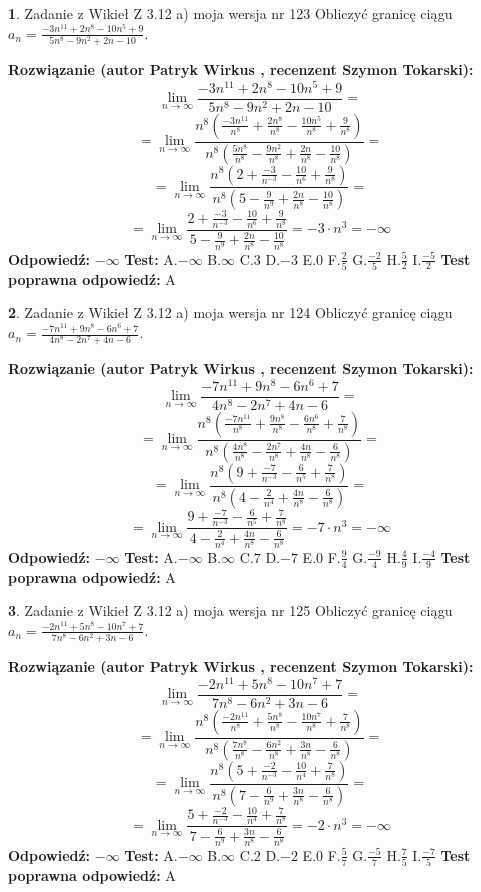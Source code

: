 \documentclass[12pt, a4paper]{article}
\theoremstyle{definition} %
\newtheorem{zad}{}
\newcommand{\zadStart}[1]{\begin{zad}#1\newline}
\newcommand{\zadStop}{\end{zad}}
\newcommand{\rozwStart}[2]{\noindent \textbf{Rozwiązanie (autor #1 , recenzent #2): }\newline}
\newcommand{\rozwStop}{\newline}
\newcommand{\odpStart}{\noindent \textbf{Odpowiedź:}\newline}
\newcommand{\odpStop}{\newline}
\newcommand{\testStart}{\noindent \textbf{Test:}\newline}
\newcommand{\testStop}{\newline}
\newcommand{\kluczStart}{\noindent \textbf{Test poprawna odpowiedź:}\newline}
\newcommand{\kluczStop}{\newline}
\begin{document}
\zadStart{Zadanie z Wikieł Z 3.12 a) moja wersja nr 123}
Obliczyć granicę ciągu $a_{n}=\frac{-3n^{11}+2n^{8}-10n^{5}+9}{5n^{8}-9n^{2}+2n-10}$.
\zadStop
\rozwStart{Patryk Wirkus}{Szymon Tokarski}
$$\lim\limits_{n\to\infty}\frac{-3n^{11}+2n^{8}-10n^{5}+9}{5n^{8}-9n^{2}+2n-10}=$$
$$=\lim\limits_{n\to\infty}\frac{n^{8}\left(\frac{-3n^{11}}{n^{8}}+\frac{2n^{8}}{n^{8}}-\frac{10n^{5}}{n^{8}}+\frac{9}{n^{8}}\right)}{n^{8}\left(\frac{5n^{8}}{n^{8}}-\frac{9n^{2}}{n^{8}}+\frac{2n}{n^{8}}-\frac{10}{n^{8}}\right)}=$$
$$=\lim\limits_{n\to\infty}\frac{n^{8}\left(2+\frac{-3}{n^{-3}}-\frac{10}{n^{6}}+\frac{9}{n^{8}}\right)}
{n^{8}\left(5-\frac{9}{n^{9}}+\frac{2n}{n^{8}}-\frac{10}{n^{8}}\right)}=$$
$$=\lim\limits_{n\to\infty}\frac{2+\frac{-3}{n^{-3}}-\frac{10}{n^{6}}+\frac{9}{n^{8}}}{5-\frac{9}{n^{9}}+\frac{2n}{n^{8}}-\frac{10}{n^{8}}}=-3\cdot n^{3} = -\infty$$
\rozwStop
\odpStart
$-\infty$
\odpStop
\testStart
A.$-\infty$
B.$\infty$
C.$3$
D.$-3$
E.$0$
F.$\frac{2}{5}$
G.$\frac{-2}{5}$
H.$\frac{5}{2}$
I.$\frac{-5}{2}$
\testStop
\kluczStart
A
\kluczStop



\zadStart{Zadanie z Wikieł Z 3.12 a) moja wersja nr 124}
Obliczyć granicę ciągu $a_{n}=\frac{-7n^{11}+9n^{8}-6n^{6}+7}{4n^{8}-2n^{7}+4n-6}$.
\zadStop
\rozwStart{Patryk Wirkus}{Szymon Tokarski}
$$\lim\limits_{n\to\infty}\frac{-7n^{11}+9n^{8}-6n^{6}+7}{4n^{8}-2n^{7}+4n-6}=$$
$$=\lim\limits_{n\to\infty}\frac{n^{8}\left(\frac{-7n^{11}}{n^{8}}+\frac{9n^{8}}{n^{8}}-\frac{6n^{6}}{n^{8}}+\frac{7}{n^{8}}\right)}{n^{8}\left(\frac{4n^{8}}{n^{8}}-\frac{2n^{7}}{n^{8}}+\frac{4n}{n^{8}}-\frac{6}{n^{8}}\right)}=$$
$$=\lim\limits_{n\to\infty}\frac{n^{8}\left(9+\frac{-7}{n^{-3}}-\frac{6}{n^{5}}+\frac{7}{n^{8}}\right)}
{n^{8}\left(4-\frac{2}{n^{4}}+\frac{4n}{n^{8}}-\frac{6}{n^{8}}\right)}=$$
$$=\lim\limits_{n\to\infty}\frac{9+\frac{-7}{n^{-3}}-\frac{6}{n^{5}}+\frac{7}{n^{8}}}{4-\frac{2}{n^{4}}+\frac{4n}{n^{8}}-\frac{6}{n^{8}}}=-7\cdot n^{3} = -\infty$$
\rozwStop
\odpStart
$-\infty$
\odpStop
\testStart
A.$-\infty$
B.$\infty$
C.$7$
D.$-7$
E.$0$
F.$\frac{9}{4}$
G.$\frac{-9}{4}$
H.$\frac{4}{9}$
I.$\frac{-4}{9}$
\testStop
\kluczStart
A
\kluczStop



\zadStart{Zadanie z Wikieł Z 3.12 a) moja wersja nr 125}
Obliczyć granicę ciągu $a_{n}=\frac{-2n^{11}+5n^{8}-10n^{7}+7}{7n^{8}-6n^{2}+3n-6}$.
\zadStop
\rozwStart{Patryk Wirkus}{Szymon Tokarski}
$$\lim\limits_{n\to\infty}\frac{-2n^{11}+5n^{8}-10n^{7}+7}{7n^{8}-6n^{2}+3n-6}=$$
$$=\lim\limits_{n\to\infty}\frac{n^{8}\left(\frac{-2n^{11}}{n^{8}}+\frac{5n^{8}}{n^{8}}-\frac{10n^{7}}{n^{8}}+\frac{7}{n^{8}}\right)}{n^{8}\left(\frac{7n^{8}}{n^{8}}-\frac{6n^{2}}{n^{8}}+\frac{3n}{n^{8}}-\frac{6}{n^{8}}\right)}=$$
$$=\lim\limits_{n\to\infty}\frac{n^{8}\left(5+\frac{-2}{n^{-3}}-\frac{10}{n^{4}}+\frac{7}{n^{8}}\right)}
{n^{8}\left(7-\frac{6}{n^{9}}+\frac{3n}{n^{8}}-\frac{6}{n^{8}}\right)}=$$
$$=\lim\limits_{n\to\infty}\frac{5+\frac{-2}{n^{-3}}-\frac{10}{n^{4}}+\frac{7}{n^{8}}}{7-\frac{6}{n^{9}}+\frac{3n}{n^{8}}-\frac{6}{n^{8}}}=-2\cdot n^{3} = -\infty$$
\rozwStop
\odpStart
$-\infty$
\odpStop
\testStart
A.$-\infty$
B.$\infty$
C.$2$
D.$-2$
E.$0$
F.$\frac{5}{7}$
G.$\frac{-5}{7}$
H.$\frac{7}{5}$
I.$\frac{-7}{5}$
\testStop
\kluczStart
A
\kluczStop
\end{document}
